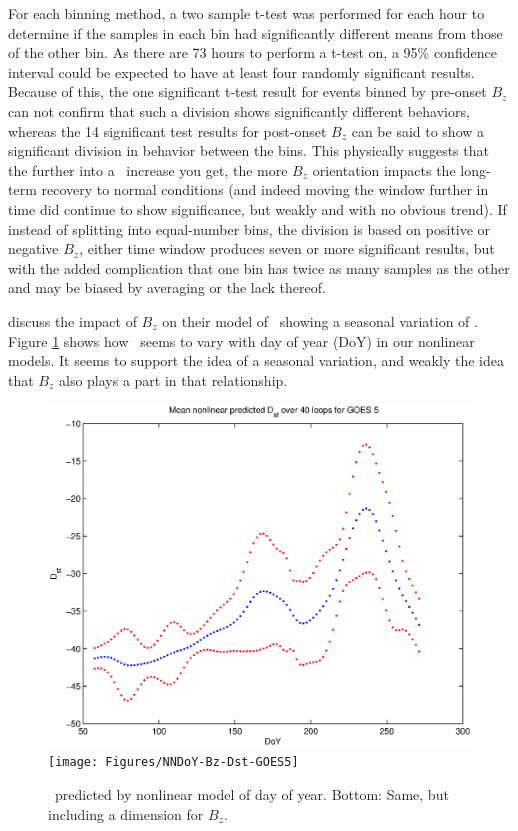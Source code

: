 For each binning method, a two sample t-test was performed for each hour to determine if the samples in each bin had significantly different means from those of the other bin. As there are 73 hours to perform a t-test on, a 95\% confidence interval could be expected to have at least four randomly significant results. Because of this, the one significant t-test result for events binned by pre-onset $B_z$ can not confirm that such a division shows significantly different behaviors, whereas the 14 significant test results for post-onset $B_z$ can be said to show a significant division in behavior between the bins. This physically suggests that the further into a \req\ increase you get, the more $B_z$ orientation impacts the long-term recovery to normal conditions (and indeed moving the window further in time did continue to show significance, but weakly and with no obvious trend). If instead of splitting into equal-number bins, the division is based on positive or negative $B_z$, either time window produces seven or more significant results, but with the added complication that one bin has twice as many samples as the other and may be biased by averaging or the lack thereof. 

\cite{Temerin2002NewModelPredictionDst} discuss the impact of $B_z$ on their model of \dst\ showing a seasonal variation of \dst. Figure \ref{fig:DoYDst} shows how \dst\ seems to vary with day of year (DoY) in our nonlinear models. It seems to support the idea of a seasonal variation, and weakly the idea that $B_z$ also plays a part in that relationship.

\begin{figure}[htp!]
	\centering
	\includegraphics[width=0.7\linewidth]{Figures/NNDoY-Dst-GOES5}	
	\texttt{[image: Figures/NNDoY-Bz-Dst-GOES5]}
	\caption{\dst\ predicted by nonlinear model of day of year. Bottom: Same, but including a dimension for $B_z$. }
	\label{fig:DoYDst}
\end{figure}
